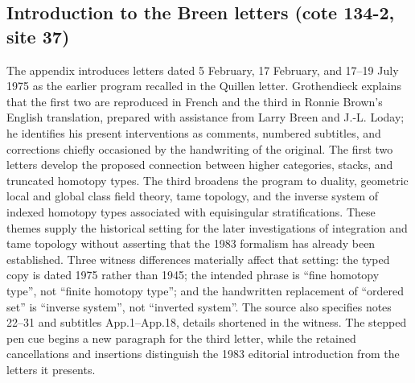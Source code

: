 \documentclass[10pt,oneside]{book}
\begin{document}
\subsection*{Introduction to the Breen letters (cote 134-2, site 37)}
The appendix introduces letters dated 5 February, 17 February, and 17--19 July 1975 as the earlier program recalled in the Quillen letter. Grothendieck explains that the first two are reproduced in French and the third in Ronnie Brown's English translation, prepared with assistance from Larry Breen and J.-L. Loday; he identifies his present interventions as comments, numbered subtitles, and corrections chiefly occasioned by the handwriting of the original. The first two letters develop the proposed connection between higher categories, stacks, and truncated homotopy types. The third broadens the program to duality, geometric local and global class field theory, tame topology, and the inverse system of indexed homotopy types associated with equisingular stratifications. These themes supply the historical setting for the later investigations of integration and tame topology without asserting that the 1983 formalism has already been established. Three witness differences materially affect that setting: the typed copy is dated 1975 rather than 1945; the intended phrase is ``fine homotopy type'', not ``finite homotopy type''; and the handwritten replacement of ``ordered set'' is ``inverse system'', not ``inverted system''. The source also specifies notes 22--31 and subtitles App.1--App.18, details shortened in the witness. The stepped pen cue begins a new paragraph for the third letter, while the retained cancellations and insertions distinguish the 1983 editorial introduction from the letters it presents.
\end{document}
